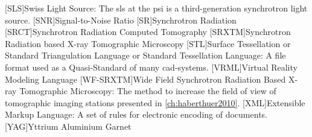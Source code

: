 \begin{acronym}[WF-SRXTM]
		[SLS]{Swiss Light Source}: The \acs{sls} at the \acs{psi} is a third-generation synchrotron light source.
		[SNR]{Signal-to-Noise Ratio}
		[SR]{Synchrotron Radiation}
		{Synchrotron Radiation Computed Tomography}
		[SRXTM]{Synchrotron Radiation based X-ray Tomographic Microscopy}
		[STL]{Surface Tessellation or Standard Triangulation Language or Standard Tessellation Language}: A file format used as a Quasi-Standard of many \acs{cad}-systems.
		{Virtual Reality Modeling Language}
		[WF-SRXTM]{Wide Field Synchrotron Radiation Based X-ray Tomographic Microscopy}: The method to increase the field of view of tomographic imaging stations presented in \autoref{ch:haberthuer2010}.
		[XML]{Extensible Markup Language}: A set of rules for electronic encoding of documents.
		[YAG]{Yttrium Aluminium Garnet}
	\end{acronym}
\endgroup

\cleardoublepage